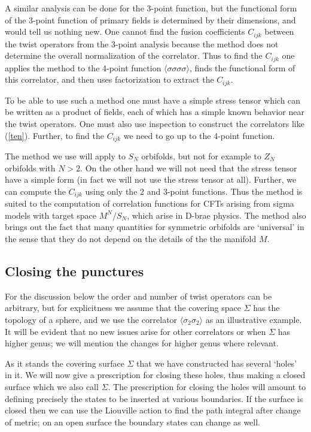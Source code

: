 \documentclass[12pt]{article}
\begin{document}
A similar analysis can be done for the 3-point function, but the
functional form of the 3-point function of primary fields is
determined by their dimensions, and would tell us nothing new. One
cannot find the fusion coefficients $C_{ijk}$ between
the twist operators from the 3-point analysis because the method does
not determine the overall normalization of the
correlator. Thus to find the $C_{ijk}$ one applies the method to the
4-point function $\langle\sigma\sigma\sigma\sigma\rangle $, finds
the functional form of this correlator, and then uses factorization
to extract the $C_{ijk}$.

To be able to use such a method one must have a simple stress tensor
which can be written as a product of fields, each of
which has a simple known behavior near the twist operators. One must
also use inspection to construct the correlators
like (\ref{ten}). Further, to find the $C_{ijk}$ we need to go up to
the 4-point function.

The method we use will apply  to  $S_N$ orbifolds, but not for
example to $Z_N$ orbifolds with $N>2$. On the other hand
we will not need that the stress tensor have a simple form (in fact
we will not use the stress tensor at all). Further, we can
compute the $C_{ijk}$ using only  the 2 and 3-point functions.  Thus
the method is suited to the computation of
correlation functions for CFTs arising from sigma models with target
space $M^N/S_N$, which arise in D-brae physics.  The method  also 
brings out the fact
that many quantities for symmetric orbifolds are `universal' in the
sense that they do not depend on the details of the the
manifold $M$.



\subsection{Closing the punctures}
\label{closing}

For  the discussion below the order and number of twist operators can
be arbitrary, but for explicitness we
assume that the covering space $\Sigma$ has the topology of a sphere, 
and we use the correlator
$\langle\sigma_2\sigma_2\rangle$ as an illustrative example. It will 
be evident that no new issues
arise for other correlators or when  $\Sigma$ has higher genus;  we 
will  mention  the
changes for higher genus where relevant.


As it stands the covering surface $\Sigma$ that we have constructed
has several `holes' in it. We will now
give a prescription for closing these holes, thus making a closed
surface which we also call $\Sigma$. The
prescription for closing the holes will amount  to defining
precisely the states  to be inserted at various
boundaries.  If the surface is closed then we can use the Liouville 
action to find the path
integral after change of metric; on an open surface the boundary 
states can change as well.
\end{document}
